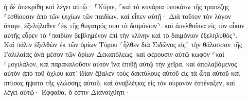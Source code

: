 \documentclass{openreader}
\begin{document}
ἡ δὲ ἀπεκρίθη καὶ λέγει αὐτῷ· ⸀Κύριε, ⸀καὶ τὰ κυνάρια ὑποκάτω τῆς τραπέζης ⸀ἐσθίουσιν ἀπὸ τῶν ψιχίων τῶν παιδίων. 
καὶ εἶπεν αὐτῇ· Διὰ τοῦτον τὸν λόγον ὕπαγε, ἐξελήλυθεν ⸂ἐκ τῆς θυγατρός σου τὸ δαιμόνιον⸃. 
καὶ ἀπελθοῦσα εἰς τὸν οἶκον αὐτῆς εὗρεν τὸ ⸂παιδίον βεβλημένον ἐπὶ τὴν κλίνην καὶ τὸ δαιμόνιον ἐξεληλυθός⸃. 
Καὶ πάλιν ἐξελθὼν ἐκ τῶν ὁρίων Τύρου ⸂ἦλθεν διὰ Σιδῶνος εἰς⸃ τὴν θάλασσαν τῆς Γαλιλαίας ἀνὰ μέσον τῶν ὁρίων Δεκαπόλεως. 
καὶ φέρουσιν αὐτῷ κωφὸν ⸀καὶ ⸀μογιλάλον, καὶ παρακαλοῦσιν αὐτὸν ἵνα ἐπιθῇ αὐτῷ τὴν χεῖρα. 
καὶ ἀπολαβόμενος αὐτὸν ἀπὸ τοῦ ὄχλου κατ’ ἰδίαν ἔβαλεν τοὺς δακτύλους αὐτοῦ εἰς τὰ ὦτα αὐτοῦ καὶ πτύσας ἥψατο τῆς γλώσσης αὐτοῦ, 
καὶ ἀναβλέψας εἰς τὸν οὐρανὸν ἐστέναξεν, καὶ λέγει αὐτῷ· Εφφαθα, ὅ ἐστιν Διανοίχθητι· 
\end{document}
